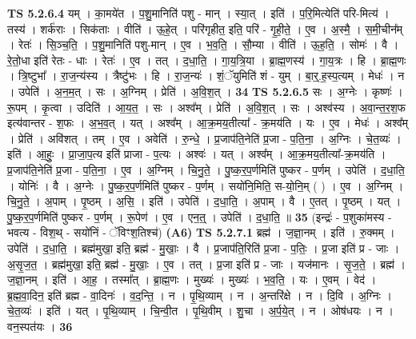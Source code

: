 \documentclass[17pt]{extarticle}
\begin{document}
                  \newline
                                \textbf{ TS 5.2.6.4} \newline
                  यम् । का॒मये॑त । प॒शु॒मानिति॑ पशु - मान् । स्या॒त् । इति॑ । प॒रि॒मित्येति॑ परि-मित्य॑ । तस्य॑ । शर्क॑राः । सिक॑ताः । वीति॑ । ऊ॒हे॒त् । परि॑गृहीत॒ इति॒ परि॑ - गृ॒ही॒ते॒ । ए॒व । अ॒स्मै॒ । स॒मी॒चीन᳚म् । रेतः॑ । सि॒ञ्च॒ति॒ । प॒शु॒मानिति॑ पशु-मान् । ए॒व । भ॒व॒ति॒ । सौ॒म्या । वीति॑ । ऊ॒ह॒ति॒ । सोमः॑ । वै । रे॒तो॒धा इति॑ रेतः - धाः । रेतः॑ । ए॒व । तत् । द॒धा॒ति॒ । गा॒य॒त्रि॒या । ब्रा॒ह्म॒णस्य॑ । गा॒य॒त्रः । हि । ब्रा॒ह्म॒णः । त्रि॒ष्टुभा᳚ । रा॒ज॒न्य॑स्य । त्रैष्टु॑भः । हि । रा॒ज॒न्यः॑ । शं॒ॅयुमिति॑ शं - युम् । बा॒र्॒.ह॒स्प॒त्यम् । मेधः॑ । न । उपेति॑ । अ॒न॒म॒त् । सः । अ॒ग्निम् । प्रेति॑ । अ॒वि॒श॒त् । \textbf{  34} \newline
                  \newline
                                \textbf{ TS 5.2.6.5} \newline
                  सः । अ॒ग्नेः । कृष्णः॑ । रू॒पम् । कृ॒त्वा । उदिति॑ । आ॒य॒त॒ । सः । अश्व᳚म् । प्रेति॑ । अ॒वि॒श॒त् । सः । अश्व॑स्य । अ॒वा॒न्त॒र॒श॒फ इत्य॑वान्तर - श॒फः । अ॒भ॒व॒त् । यत् । अश्व᳚म् । आ॒क्र॒मय॒तीत्या᳚ - क्र॒मय॑ति । यः । ए॒व । मेधः॑ । अश्व᳚म् । प्रेति॑ । अवि॑शत् । तम् । ए॒व । अवेति॑ । रु॒न्धे॒ । प्र॒जाप॑ति॒नेति॑ प्र॒जा - प॒ति॒ना॒ । अ॒ग्निः । चे॒त॒व्यः॑ । इति॑ । आ॒हुः॒ । प्रा॒जा॒प॒त्य इति॑ प्राजा - प॒त्यः । अश्वः॑ । यत् । अश्व᳚म् । आ॒क्र॒मय॒तीत्या᳚-क्र॒मय॑ति । प्र॒जाप॑ति॒नेति॑ प्र॒जा - प॒ति॒ना॒ । ए॒व । अ॒ग्निम् । चि॒नु॒ते॒ । पु॒ष्क॒र॒प॒र्णमिति॑ पुष्कर - प॒र्णम् । उपेति॑ । द॒धा॒ति॒ । योनिः॑ । वै । अ॒ग्नेः । पु॒ष्क॒र॒प॒र्णमिति॑ पुष्कर - प॒र्णम् । सयो॑नि॒मिति॒ स-यो॒नि॒म् ( ) । ए॒व । अ॒ग्निम् । चि॒नु॒ते॒ । अ॒पाम् । पृ॒ष्ठम् । अ॒सि॒ । इति॑ । उपेति॑ । द॒धा॒ति॒ । अ॒पाम् । वै । ए॒तत् । पृ॒ष्ठम् । यत् । पु॒ष्क॒र॒प॒र्णमिति॑ पुष्कर - प॒र्णम् । रू॒पेण॑ । ए॒व । एन॒त्॒ । उपेति॑ । द॒धा॒ति॒ ॥ \textbf{  35} \newline
                  \newline
                      (इन्द्रः॑ - प॒शुका॑मस्य - भवत्य - विश॒थ् - सयो॑निं - ॅविꣳश॒तिश्च॑)  \textbf{(A6)} \newline \newline
                                \textbf{ TS 5.2.7.1} \newline
                  ब्रह्म॑ । ज॒ज्ञा॒नम् । इति॑ । रु॒क्मम् । उपेति॑ । द॒धा॒ति॒ । ब्रह्म॑मुखा॒ इति॒ ब्रह्म॑ - मु॒खाः॒ । वै । प्र॒जाप॑ति॒रिति॑ प्र॒जा - प॒तिः॒ । प्र॒जा इति॑ प्र - जाः । अ॒सृ॒ज॒त॒ । ब्रह्म॑मुखा॒ इति॒ ब्रह्म॑ - मु॒खाः॒ । ए॒व । तत् । प्र॒जा इति॑ प्र - जाः । यज॑मानः । सृ॒ज॒ते॒ । ब्रह्म॑ । ज॒ज्ञा॒नम् । इति॑ । आ॒ह॒ । तस्मा᳚त् । ब्रा॒ह्म॒णः । मुख्यः॑ । मुख्यः॑ । भ॒व॒ति॒ । यः । ए॒वम् । वेद॑ । ब्र॒ह्म॒वा॒दिन॒ इति॑ ब्रह्म - वा॒दिनः॑ । व॒द॒न्ति॒ । न । पृ॒थि॒व्याम् । न । अ॒न्तरि॑क्षे । न । दि॒वि । अ॒ग्निः । चे॒त॒व्यः॑ । इति॑ । यत् । पृ॒थि॒व्याम् । चि॒न्वी॒त । पृ॒थि॒वीम् । शु॒चा । अ॒र्प॒ये॒त् । न । ओष॑धयः । न । वन॒स्पत॑यः । \textbf{  36} \newline
\end{document}
